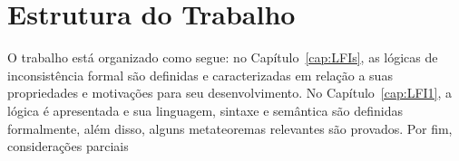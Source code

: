     \section{Estrutura do Trabalho}\label{sec:estrutura}
        O trabalho está organizado como segue: no Capítulo~\ref{cap:LFIs}, as lógicas de inconsistência formal são definidas e caracterizadas em relação a suas propriedades e motivações para seu desenvolvimento. No Capítulo~\ref{cap:LFI1}, a lógica \lfium{} é apresentada e sua linguagem, sintaxe e semântica são definidas formalmente, além disso, alguns metateoremas relevantes são provados.  Por fim,  considerações parciais 
        
    


       
